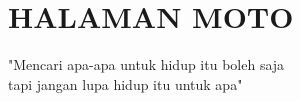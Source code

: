 \documentclass[../SKRIPSI_ALDZIKRI_DWIJAYANTO_PRATHAMA.tex]{subfiles}
\begin{document}
\chapter*{HALAMAN MOTO}
\vspace*{\fill}
\begin{center}
"Mencari apa-apa untuk hidup itu boleh saja\\
tapi jangan lupa hidup itu untuk apa"
\end{center}
\vspace*{\fill}
\end{document}
